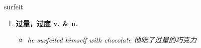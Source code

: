 
\begin{frame}
{\huge surfeit}
\begin{center}
\begin{enumerate}\Large
  \item \textbf{过量，过度 v. \& n.}
  \begin{itemize}
    \item \em{\Large{he surfeited himself with chocolate 他吃了过量的巧克力}}
  \end{itemize}
\end{enumerate}
\end{center}
\end{frame}

